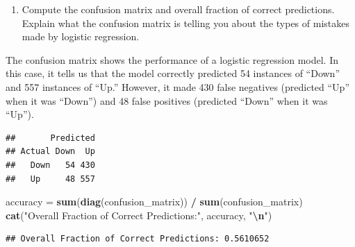 \documentclass[
]{article}
\newenvironment{Shaded}{\begin{snugshade}}{\end{snugshade}}
\newcommand{\AttributeTok}[1]{\textcolor[rgb]{0.13,0.29,0.53}{#1}}
\newcommand{\FloatTok}[1]{\textcolor[rgb]{0.00,0.00,0.81}{#1}}
\newcommand{\FunctionTok}[1]{\textcolor[rgb]{0.13,0.29,0.53}{\textbf{#1}}}
\newcommand{\NormalTok}[1]{#1}
\newcommand{\OtherTok}[1]{\textcolor[rgb]{0.56,0.35,0.01}{#1}}
\newcommand{\SpecialCharTok}[1]{\textcolor[rgb]{0.81,0.36,0.00}{\textbf{#1}}}
\newcommand{\StringTok}[1]{\textcolor[rgb]{0.31,0.60,0.02}{#1}}
\providecommand{\tightlist}{%
  \setlength{\itemsep}{0pt}\setlength{\parskip}{0pt}}
\begin{document}
\begin{enumerate}
\def\labelenumi{(\alph{enumi})}
\setcounter{enumi}{2}
\tightlist
\item
  Compute the confusion matrix and overall fraction of correct
  predictions. Explain what the confusion matrix is telling you about
  the types of mistakes made by logistic regression.
\end{enumerate}

The confusion matrix shows the performance of a logistic regression
model. In this case, it tells us that the model correctly predicted 54
instances of ``Down'' and 557 instances of ``Up.'' However, it made 430
false negatives (predicted ``Up'' when it was ``Down'') and 48 false
positives (predicted ``Down'' when it was ``Up'').

\begin{Shaded}
\end{Shaded}

\begin{verbatim}
##       Predicted
## Actual Down  Up
##   Down   54 430
##   Up     48 557
\end{verbatim}

\begin{Shaded}
\begin{Highlighting}[]
\NormalTok{accuracy }\OtherTok{=} \FunctionTok{sum}\NormalTok{(}\FunctionTok{diag}\NormalTok{(confusion\_matrix)) }\SpecialCharTok{/} \FunctionTok{sum}\NormalTok{(confusion\_matrix)}
\FunctionTok{cat}\NormalTok{(}\StringTok{"Overall Fraction of Correct Predictions:"}\NormalTok{, accuracy, }\StringTok{"}\SpecialCharTok{\textbackslash{}n}\StringTok{"}\NormalTok{)}
\end{Highlighting}
\end{Shaded}

\begin{verbatim}
## Overall Fraction of Correct Predictions: 0.5610652
\end{verbatim}
\end{document}
